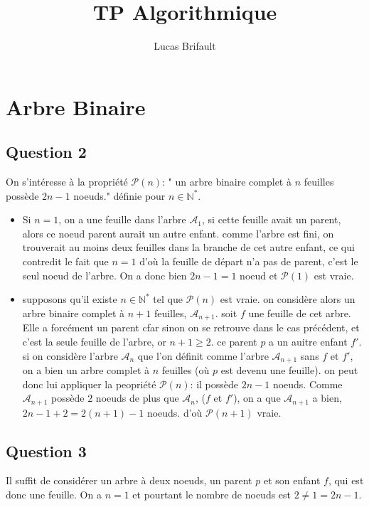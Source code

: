 \documentclass{article}
\title{TP Algorithmique}
\begin{document}
\author{Lucas Brifault}
\maketitle
\section*{Arbre Binaire}
\subsection*{Question 2}
On s'intéresse à la propriété $\mathcal{P}(n)$: " un arbre binaire complet à $n$ feuilles possède $2n-1$ noeuds." définie pour $n \in \mathbb{N}^*$.\\
\begin{itemize}
\item Si $n = 1$, on a une feuille dans l'arbre $\mathcal{A}_1$, si cette feuille avait un parent, alors ce noeud parent aurait un autre enfant. comme l'arbre est fini, on trouverait au moins deux feuilles dans la branche de cet autre enfant, ce qui contredit le fait que $n = 1$ d'où la feuille de départ n'a pas de parent, c'est le seul noeud de l'arbre. On a donc bien $2n-1 = 1$ noeud et $\mathcal{P}(1)$ est vraie.\\
\item supposons qu'il existe $n \in \mathbb{N}^*$ tel que $\mathcal{P}(n)$ est vraie. on considère alors un arbre binaire complet à $n+1$ feuilles, $\mathcal{A}_{n+1}$. soit $f$ une feuille de cet arbre. Elle a forcément un parent cfar sinon on se retrouve dans le cas précédent, et c'est la seule feuille de l'arbre, or $n+1\geq 2$. ce parent $p$ a un auitre enfant $f'$. si on considère l'arbre $\mathcal{A}_n$ que l'on définit comme l'arbre $\mathcal{A}_{n+1}$ sans $f$ et $f'$, on a bien un arbre complet à $n$ feuilles (où $p$ est devenu une feuille). on peut donc lui appliquer la peopriété $\mathcal{P}(n)$: il possède $2n-1$ noeuds. Comme $\mathcal{A}_{n+1}$ possède $2$ noeuds de plus que $\mathcal{A}_n$, ($f$ et $f'$), on a que $\mathcal{A}_{n+1}$ a bien, $2n-1+2 = 2(n+1)-1$ noeuds. d'où $\mathcal{P}(n+1)$ vraie.
\end{itemize}
\subsection*{Question 3}
Il suffit de considérer un arbre à deux noeuds, un parent $p$ et son enfant $f$, qui est donc une feuille. On a $n = 1$ et pourtant le nombre de noeuds est $2 \neq 1 = 2n-1$. 
\end{document}
